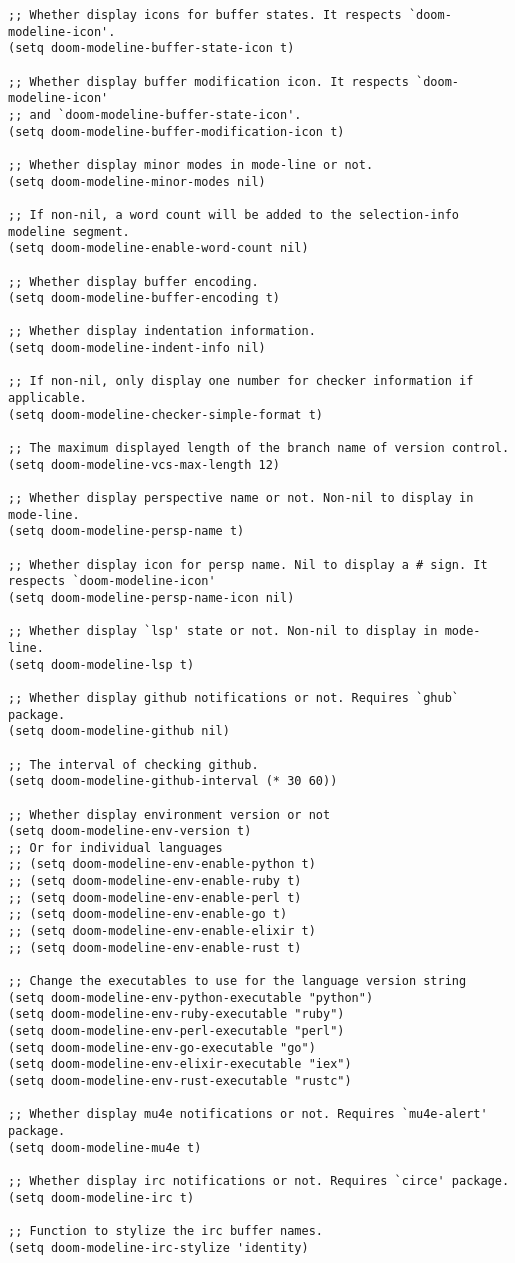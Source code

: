 \documentclass[11pt]{article}
\begin{document}
\begin{verbatim}
;; Whether display icons for buffer states. It respects `doom-modeline-icon'.
(setq doom-modeline-buffer-state-icon t)

;; Whether display buffer modification icon. It respects `doom-modeline-icon'
;; and `doom-modeline-buffer-state-icon'.
(setq doom-modeline-buffer-modification-icon t)

;; Whether display minor modes in mode-line or not.
(setq doom-modeline-minor-modes nil)

;; If non-nil, a word count will be added to the selection-info modeline segment.
(setq doom-modeline-enable-word-count nil)

;; Whether display buffer encoding.
(setq doom-modeline-buffer-encoding t)

;; Whether display indentation information.
(setq doom-modeline-indent-info nil)

;; If non-nil, only display one number for checker information if applicable.
(setq doom-modeline-checker-simple-format t)

;; The maximum displayed length of the branch name of version control.
(setq doom-modeline-vcs-max-length 12)

;; Whether display perspective name or not. Non-nil to display in mode-line.
(setq doom-modeline-persp-name t)

;; Whether display icon for persp name. Nil to display a # sign. It respects `doom-modeline-icon'
(setq doom-modeline-persp-name-icon nil)

;; Whether display `lsp' state or not. Non-nil to display in mode-line.
(setq doom-modeline-lsp t)

;; Whether display github notifications or not. Requires `ghub` package.
(setq doom-modeline-github nil)

;; The interval of checking github.
(setq doom-modeline-github-interval (* 30 60))

;; Whether display environment version or not
(setq doom-modeline-env-version t)
;; Or for individual languages
;; (setq doom-modeline-env-enable-python t)
;; (setq doom-modeline-env-enable-ruby t)
;; (setq doom-modeline-env-enable-perl t)
;; (setq doom-modeline-env-enable-go t)
;; (setq doom-modeline-env-enable-elixir t)
;; (setq doom-modeline-env-enable-rust t)

;; Change the executables to use for the language version string
(setq doom-modeline-env-python-executable "python")
(setq doom-modeline-env-ruby-executable "ruby")
(setq doom-modeline-env-perl-executable "perl")
(setq doom-modeline-env-go-executable "go")
(setq doom-modeline-env-elixir-executable "iex")
(setq doom-modeline-env-rust-executable "rustc")

;; Whether display mu4e notifications or not. Requires `mu4e-alert' package.
(setq doom-modeline-mu4e t)

;; Whether display irc notifications or not. Requires `circe' package.
(setq doom-modeline-irc t)

;; Function to stylize the irc buffer names.
(setq doom-modeline-irc-stylize 'identity)
\end{verbatim}
\end{document}
